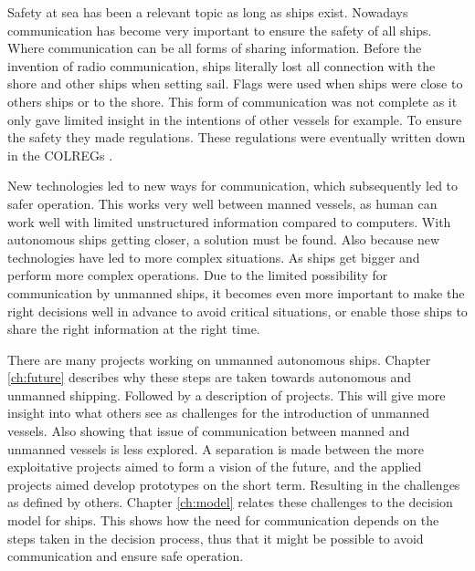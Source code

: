 Safety at sea has been a relevant topic as long as ships exist. Nowadays communication has become very important to ensure the safety of all ships. Where communication can be all forms of sharing information. Before the invention of radio communication, ships literally lost all connection with the shore and other ships when setting sail. Flags were used when ships were close to others ships or to the shore. This form of communication was not complete as it only gave limited insight in the intentions of other vessels for example. To ensure the safety they made regulations. These regulations were eventually written down in the \acf{COLREGs} \cite{IMO1972}. 

New technologies led to new ways for communication, which subsequently led to safer operation. This works very well between manned vessels, as human can work well with limited unstructured information compared to computers. With autonomous ships getting closer, a solution must be found. Also because new technologies have led to more complex situations. As ships get bigger and perform more complex operations. Due to the limited possibility for communication by unmanned ships, it becomes even more important to make the right decisions well in advance to avoid critical situations, or enable those ships to share the right information at the right time.

There are many projects working on unmanned autonomous ships. Chapter \ref{ch:future} describes why these steps are taken towards autonomous and unmanned shipping. Followed by a description of projects. This will give more insight into what others see as challenges for the introduction of unmanned vessels. Also showing that issue of communication between manned and unmanned vessels is less explored. A separation is made between the more exploitative projects aimed to form a vision of the future, and the applied projects aimed develop prototypes on the short term. Resulting in the challenges as defined by others.
Chapter \ref{ch:model} relates these challenges to the decision model for ships. This shows how the need for communication depends on the steps taken in the decision process, thus that it might be possible to avoid communication and ensure safe operation.